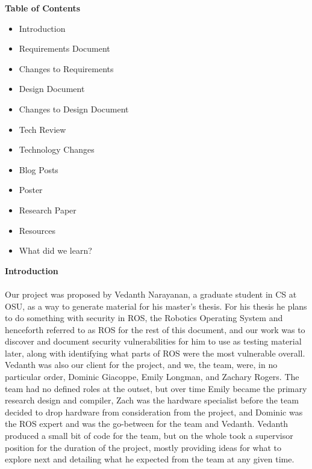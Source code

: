 \documentclass[IEEEtran,letterpaper,10pt,notitlepage,draftclsnofoot,onecolumn]{article}
\begin{document}
\begin{center}
\vspace*{\fill}
\huge
\textbf{Table of Contents}
\LARGE 
\begin{itemize}
\item Introduction
\item Requirements Document
\item Changes to Requirements
\item Design Document
\item Changes to Design Document
\item Tech Review
\item Technology Changes
\item Blog Posts
\item Poster
\item Research Paper
\item Resources
\item What did we learn?
\end{itemize}
\vspace*{\fill}
\end{center}
\newpage

\LARGE\textbf{Introduction\\ \\}
\normalsize Our project was proposed by Vedanth Narayanan, a graduate student in CS at 
OSU, as a way to generate material for his master’s thesis. For his thesis 
he plans to do something with security in ROS, the Robotics Operating System 
and henceforth referred to as ROS for the rest of this document, and our 
work was to discover and document security vulnerabilities for him to use as 
testing material later, along with identifying what parts of ROS were the most 
vulnerable overall. Vedanth was also our client for the project, and we, the team, 
were, in no particular order, Dominic Giacoppe, Emily Longman, and Zachary Rogers. 
The team had no defined roles at the outset, but over time Emily became the primary 
research design and compiler, Zach was the hardware specialist before the team 
decided to drop hardware from consideration from the project, and Dominic was the 
ROS expert and was the go-between for the team and Vedanth. Vedanth produced a 
small bit of code for the team, but on the whole took a supervisor position for 
the duration of the project, mostly providing ideas for what to explore next 
and detailing what he expected from the team at any given time. \\
\end{document}
